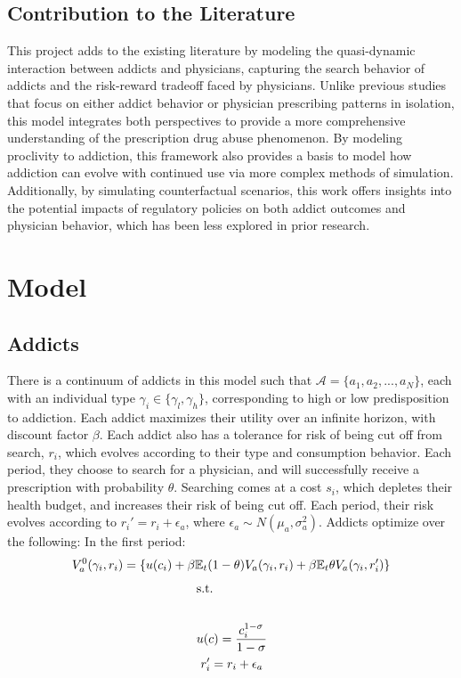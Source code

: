 \documentclass[11pt,a4paper]{article}
\begin{document}
\subsection{Contribution to the Literature}
\label{subsec:limitations}

This project adds to the existing literature by modeling the quasi-dynamic interaction between addicts and physicians, capturing the search behavior of addicts and the risk-reward tradeoff faced by physicians. Unlike previous studies that focus on either addict behavior or physician prescribing patterns in isolation, this model integrates both perspectives to provide a more comprehensive understanding of the prescription drug abuse phenomenon. By modeling proclivity to addiction, this framework also provides a basis to model how addiction can evolve with continued use via more complex methods of simulation. Additionally, by simulating counterfactual scenarios, this work offers insights into the potential impacts of regulatory policies on both addict outcomes and physician behavior, which has been less explored in prior research.

\section{Model}
\label{sec:methodology}

\subsection{Addicts}

There is a continuum of addicts in this model such that $\mathcal{A} = \{a_1, a_2, ..., a_N\}$, each with an individual type $\gamma_i \in \{\gamma_l, \gamma_h\}$,
corresponding to high or low predisposition to addiction. Each addict maximizes their utility over an infinite horizon, with discount factor $\beta$.
Each addict also has a tolerance for risk of being cut off from search, $r_i$, which evolves according to their type and consumption behavior. Each
period, they choose to search for a physician, and will successfully receive a prescription with probability  $\theta$. Searching comes at a cost $s_i$, which depletes their health budget, and increases their risk of being cut off.
Each period, their risk evolves according to $r_i' = r_i + \epsilon_{a}$, where $\epsilon_{a} \sim N(\mu_a, \sigma_a^2)$. Addicts optimize over the following:
In the first period:
\begin{equation}
  V_a^0(\gamma_i, r_i) = \{u(c_i) + \beta\mathbb{E}_t(1-\theta)V_a(\gamma_i, r_i) + \beta\mathbb{E}_{t}\theta V_a(\gamma_i, r_i')\} \\
\end{equation}
\begin{gather*}
  \shortintertext{s.t.} \\
  u(c) = \frac{c_i^{1-\sigma}}{1-\sigma} \\
  r_i' = r_i + \epsilon_{a}
\end{gather*}
\end{document}
